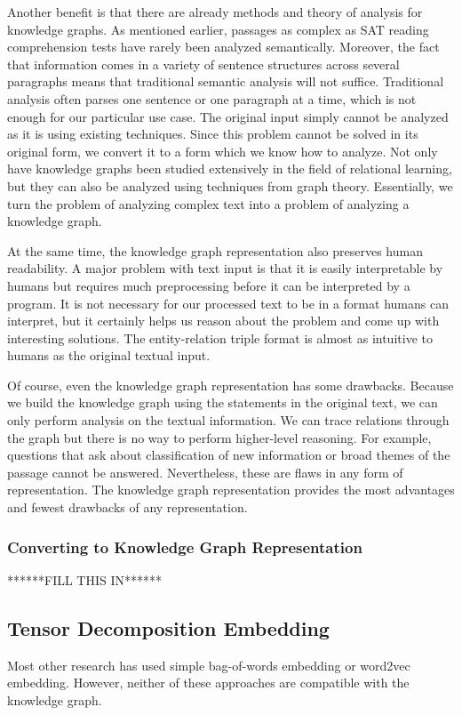 \documentclass[pageno]{jpaper}
\begin{document}
Another benefit is that there are already methods and theory of analysis for
knowledge graphs. As mentioned earlier, passages as complex as SAT reading
comprehension tests have rarely been analyzed semantically. Moreover, the fact
that information comes in a variety of sentence structures across several
paragraphs means that traditional semantic analysis will not suffice.
Traditional analysis often parses one sentence or one paragraph at a time, which
is not enough for our particular use case. The original input simply cannot be
analyzed as it is using existing techniques. Since this problem cannot be solved
in its original form, we convert it to a form which we know how to analyze. Not
only have knowledge graphs been studied extensively in the field of relational
learning, but they can also be analyzed using techniques from graph theory.
Essentially, we turn the problem of analyzing complex text into a problem of
analyzing a knowledge graph.

At the same time, the knowledge graph representation also preserves human
readability. A major problem with text input is that it is easily interpretable
by humans but requires much preprocessing before it can be interpreted by a
program. It is not necessary for our processed text to be in a format humans can
interpret, but it certainly helps us reason about the problem and come up with
interesting solutions. The entity-relation triple format is almost as intuitive
to humans as the original textual input.

Of course, even the knowledge graph representation has some drawbacks. Because
we build the knowledge graph using the statements in the original text, we can
only perform analysis on the textual information. We can trace relations through
the graph but there is no way to perform higher-level reasoning. For example,
questions that ask about classification of new information or broad themes of
the passage cannot be answered. Nevertheless, these are flaws in any form of
representation. The knowledge graph representation provides the most advantages
and fewest drawbacks of any representation. \\

\subsubsection{Converting to Knowledge Graph Representation}
\label{Converting to Knowledge Graph Representation}
******FILL THIS IN******

\subsection{Tensor Decomposition Embedding}
\label{Tensor Decomposition Embedding}
Most other research has used simple bag-of-words embedding or
word2vec embedding. However, neither of these approaches are compatible with the
knowledge graph. 
\end{document}
